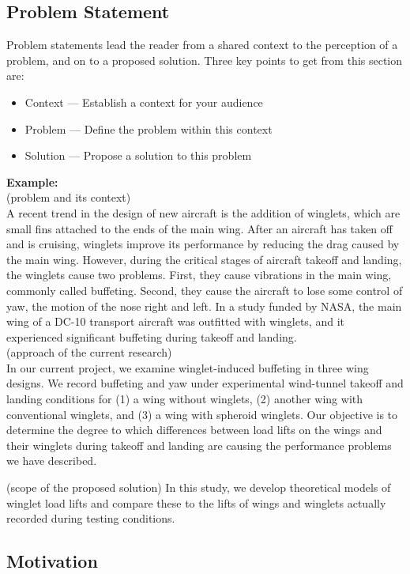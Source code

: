 \documentclass[hidelinks,a4paper,12pt]{article}
\begin{document}
\subsection{Problem Statement}
Problem statements lead the reader from a shared context to the perception of a problem, and on to a proposed solution.
Three key points to get from this section are:\\
\begin{itemize}
    \item Context — Establish a context for your audience
    \item Problem — Define the problem within this context
    \item Solution — Propose a solution to this problem
\end{itemize}
\textbf{Example:}\\
(problem and its context)\\
A recent trend in the design of new aircraft is the addition of winglets, which are small fins attached to the ends of the main wing. After an aircraft has taken off and is cruising, winglets improve its performance by reducing the drag caused by the main wing. However, during the critical stages of aircraft takeoff and landing, the winglets cause two problems. First, they cause vibrations in the main wing, commonly called buffeting. Second, they cause the aircraft to lose some control of yaw, the motion of the nose right and left. In a study funded by NASA, the main wing of a DC-10 transport aircraft was outfitted with winglets, and it experienced significant buffeting during takeoff and landing.\\
(approach of the current research)\\ In our current project, we examine winglet-induced buffeting in three wing designs. We record buffeting and yaw under experimental wind-tunnel takeoff and landing conditions for (1) a wing without winglets, (2) another wing with conventional winglets, and (3) a wing with spheroid winglets. Our objective is to determine the degree to which differences between load lifts on the wings and their winglets during takeoff and landing are causing the performance problems we have described.

(scope of the proposed solution) In this study, we develop theoretical models of winglet load lifts and compare these to the lifts of wings and winglets actually recorded during testing conditions.
\subsection{Motivation}
\end{document}
